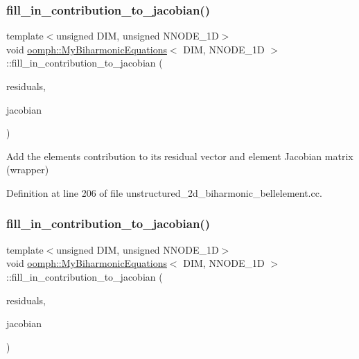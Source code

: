 \subsubsection{\texorpdfstring{fill\+\_\+in\+\_\+contribution\+\_\+to\+\_\+jacobian()}{fill\_in\_contribution\_to\_jacobian()}\hspace{0.1cm}{\footnotesize\ttfamily [1/2]}}
{\footnotesize\ttfamily template$<$unsigned D\+IM, unsigned N\+N\+O\+D\+E\+\_\+1D$>$ \\
void \hyperlink{classoomph_1_1MyBiharmonicEquations}{oomph\+::\+My\+Biharmonic\+Equations}$<$ D\+IM, N\+N\+O\+D\+E\+\_\+1D $>$\+::fill\+\_\+in\+\_\+contribution\+\_\+to\+\_\+jacobian (\begin{DoxyParamCaption}\item[{Vector$<$ double $>$ \&}]{residuals,  }\item[{Dense\+Matrix$<$ double $>$ \&}]{jacobian }\end{DoxyParamCaption})\hspace{0.3cm}{\ttfamily [inline]}}

Add the element\textquotesingle{}s contribution to its residual vector and element Jacobian matrix (wrapper) 

Definition at line 206 of file unstructured\+\_\+2d\+\_\+biharmonic\+\_\+bellelement.\+cc.

\mbox{\label{classoomph_1_1MyBiharmonicEquations_ad5ef6af62c0ebf27bacf62be8d408c8a}} 
\subsubsection{\texorpdfstring{fill\+\_\+in\+\_\+contribution\+\_\+to\+\_\+jacobian()}{fill\_in\_contribution\_to\_jacobian()}\hspace{0.1cm}{\footnotesize\ttfamily [2/2]}}
{\footnotesize\ttfamily template$<$unsigned D\+IM, unsigned N\+N\+O\+D\+E\+\_\+1D$>$ \\
void \hyperlink{classoomph_1_1MyBiharmonicEquations}{oomph\+::\+My\+Biharmonic\+Equations}$<$ D\+IM, N\+N\+O\+D\+E\+\_\+1D $>$\+::fill\+\_\+in\+\_\+contribution\+\_\+to\+\_\+jacobian (\begin{DoxyParamCaption}\item[{Vector$<$ double $>$ \&}]{residuals,  }\item[{Dense\+Matrix$<$ double $>$ \&}]{jacobian }\end{DoxyParamCaption})\hspace{0.3cm}{\ttfamily [inline]}}

